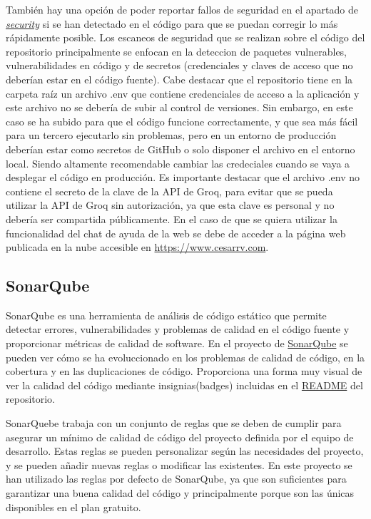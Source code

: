 También hay una opción de poder reportar fallos de seguridad en el apartado de \href{https://github.com/CesarRodrigu/GII-24.19-contramedidas-IoT-mediante-reinforcement-learning/security}{\textit{security}} si se han detectado en el código para que se puedan corregir lo más rápidamente posible.
Los escaneos de seguridad que se realizan sobre el código del repositorio principalmente se enfocan en la deteccion de paquetes vulnerables, vulnerabilidades en código y de secretos (credenciales y claves de acceso que no deberían estar en el código fuente).
Cabe destacar que el repositorio tiene en la carpeta raíz un archivo .env que contiene credenciales de acceso a la aplicación y este archivo no se debería de subir al control de versiones. Sin embargo, en este caso se ha subido para que el código funcione correctamente, y que sea más fácil para un tercero ejecutarlo sin problemas, pero en un entorno de producción deberían estar como secretos de GitHub o solo disponer el archivo en el entorno local. Siendo altamente recomendable cambiar las credeciales cuando se vaya a desplegar el código en producción.
Es importante destacar que el archivo .env no contiene el secreto de la clave de la API de Groq, para evitar que se pueda utilizar la API de Groq sin autorización, ya que esta clave es personal y no debería ser compartida públicamente. En el caso de que se quiera utilizar la funcionalidad del chat de ayuda de la web se debe de acceder a la página web publicada en la nube accesible en \url{https://www.cesarrv.com}.

\subsection{SonarQube}
\label{subsec:sonarqube}
SonarQube es una herramienta de análisis de código estático que permite detectar errores, vulnerabilidades y problemas de calidad en el código fuente y proporcionar métricas de calidad de software. En el proyecto de \href{https://sonarcloud.io/project/overview?id=CesarRodrigu_GII-24.19-contramedidas-IoT-mediante-reinforcement-learning}{SonarQube} se pueden ver cómo se ha evoluccionado en los problemas de calidad de código, en la cobertura y en las duplicaciones de código. Proporciona una forma muy visual de ver la calidad del código mediante insignias(badges) incluidas en el \href{https://github.com/CesarRodrigu/GII-24.19-contramedidas-IoT-mediante-reinforcement-learning/blob/main/README.md}{README} del repositorio.

SonarQuebe trabaja con un conjunto de reglas que se deben de cumplir para asegurar un mínimo de calidad de código del proyecto definida por el equipo de desarrollo. Estas reglas se pueden personalizar según las necesidades del proyecto, y se pueden añadir nuevas reglas o modificar las existentes. En este proyecto se han utilizado las reglas por defecto de SonarQube, ya que son suficientes para garantizar una buena calidad del código y principalmente porque son las únicas disponibles en el plan gratuito.


